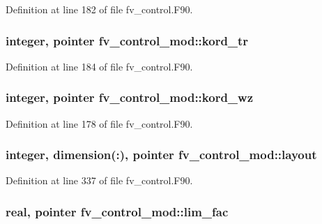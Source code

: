 Definition at line 182 of file fv\-\_\-control.\-F90.

\subsubsection[{kord\-\_\-tr}]{\setlength{\rightskip}{0pt plus 5cm}integer, pointer fv\-\_\-control\-\_\-mod\-::kord\-\_\-tr\hspace{0.3cm}{\ttfamily [private]}}\label{classfv__control__mod_ab086182327f3d6ab0b8c634608845252}


Definition at line 184 of file fv\-\_\-control.\-F90.

\subsubsection[{kord\-\_\-wz}]{\setlength{\rightskip}{0pt plus 5cm}integer, pointer fv\-\_\-control\-\_\-mod\-::kord\-\_\-wz\hspace{0.3cm}{\ttfamily [private]}}\label{classfv__control__mod_a59c2ef1ff452aa8609a6f0adf8934196}


Definition at line 178 of file fv\-\_\-control.\-F90.

\subsubsection[{layout}]{\setlength{\rightskip}{0pt plus 5cm}integer, dimension(\-:), pointer fv\-\_\-control\-\_\-mod\-::layout\hspace{0.3cm}{\ttfamily [private]}}\label{classfv__control__mod_afe243c14856ffd8377a4cfb0b5f14e84}


Definition at line 337 of file fv\-\_\-control.\-F90.

\subsubsection[{lim\-\_\-fac}]{\setlength{\rightskip}{0pt plus 5cm}real, pointer fv\-\_\-control\-\_\-mod\-::lim\-\_\-fac\hspace{0.3cm}{\ttfamily [private]}}\label{classfv__control__mod_a47bfac3f007039bf56a2aea807ae6fc5}


